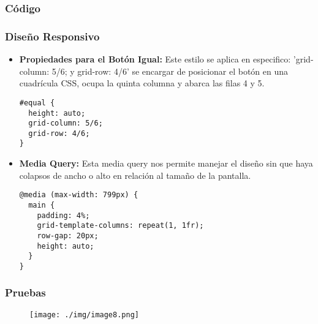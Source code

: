 \documentclass{article}
\begin{document}
\subsubsection{Código}
\subsubsection{Diseño Responsivo}
\begin{itemize}
\item{\textbf{Propiedades para el Botón Igual:}
Este estilo se aplica en especifico: 'grid-column: 5/6; y grid-row: 4/6' se encargar de posicionar el botón en una cuadrícula CSS, ocupa la quinta columna y abarca las filas 4 y 5.} 
\begin{lstlisting}[style=ascii-tree]
#equal {
  height: auto;
  grid-column: 5/6;
  grid-row: 4/6;
}
\end{lstlisting}
\item{\textbf{Media Query:}
Esta media query nos permite manejar el diseño sin que haya colapsos de ancho o alto en relación al tamaño de la pantalla.}
\begin{lstlisting}[style=ascii-tree]
@media (max-width: 799px) {
  main {
    padding: 4%;
    grid-template-columns: repeat(1, 1fr);
    row-gap: 20px;
    height: auto;
  }
}
\end{lstlisting}
\end{itemize}
\subsubsection{Pruebas}
\begin{figure}[H]
    \centering
    \texttt{[image: ./img/image8.png]}
\end{figure}
\end{document}
